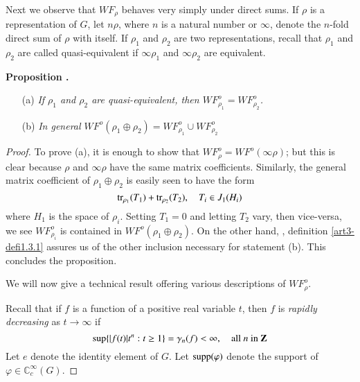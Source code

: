 Next we observe that $WF_{\rho}$ behaves very simply under direct sums. If $\rho$ is a representation of $G$, let $n\rho$, where $n$ is a natural number or $\infty$, denote the $n$-fold direct sum of $\rho$ with itself. If $\rho_{1}$ and $\rho_{2}$ are two representations, recall that $\rho_{1}$ and $\rho_{2}$ are called quasi-equivalent if $\infty \rho_{1}$ and $\infty \rho_{2}$ are equivalent.

\medskip
\noindent
{\bf Proposition .\label{art3-prop1.3}}
\begin{itemize}
\item[(a)] {\em If $\rho_{1}$ and $\rho_{2}$ are quasi-equivalent, then $WF^{o}_{\rho_{1}}=WF^{o}_{\rho_{2}}$.}

\item[(b)] {\em In general $WF^{o}(\rho_{1}\oplus \rho_{2})=WF^{o}_{\rho_{1}}\cup WF^{o}_{\rho_{2}}$}
\end{itemize}

\begin{proof}
To prove (a), it is enough to show that $WF^{o}_{\rho}=WF^{o}(\infty\rho)$; but this is clear because $\rho$ and $\infty \rho$ have the same matrix coefficients. Similarly, the general matrix coefficient of $\rho_{1}\oplus \rho_{2}$ is easily seen to have the form
$$
\operatorname{tr}_{\rho_{1}}(T_{1})+\operatorname{tr}_{\rho_{2}}(T_{2}),\quad T_{i}\in J_{1}(H_{i})
$$
where $H_{1}$ is the space of $\rho_{i}$. Setting $T_{1}=0$ and letting $T_{2}$ vary, then vice-versa, we see $WF^{o}_{\rho_{i}}$ is contained in $WF^{o}(\rho_{1}\oplus \rho_{2})$. On the other hand, \cite{art3-D}, definition \ref{art3-defi1.3.1} assures us of the other inclusion necessary for statement (b). This concludes the proposition.

We will now give a technical result offering various descriptions of $WF^{o}_{\rho}$.

Recall that if $f$ is a function of a positive real variable $t$, then $f$ is {\em rapidly decreasing} as $t\to \infty$ if
\begin{equation*}
\sup \{|f(t)|t^{n}:t\geq 1\}=\gamma_{n}(f)<\infty,\quad\text{all $n$ in $\mathbf{Z}$}
\end{equation*}
Let $e$ denote the identity element of $G$. Let $\operatorname{supp}(\varphi)$ denote the support of $\varphi\in \mathbb{C}^{\infty}_{c}(G)$.
\end{proof}

